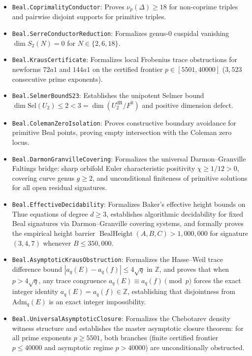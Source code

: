 \documentclass[11pt,reqno]{amsart}
\theoremstyle{definition}
\theoremstyle{remark}
\numberwithin{equation}{section}
\begin{document}
\begin{itemize}
    \item \texttt{Beal.CoprimalityConductor}: Proves $\nu_p(\Delta) \ge 18$ for non-coprime triples and pairwise disjoint supports for primitive triples.
    \item \texttt{Beal.SerreConductorReduction}: Formalizes genus-0 cuspidal vanishing $\dim S_2(N) = 0$ for $N \in \{2, 6, 18\}$.
    \item \texttt{Beal.KrausCertificate}: Formalizes local Frobenius trace obstructions for newforms $72a1$ and $144a1$ on the certified frontier $p \in [5501, 40000]$ ($3,523$ consecutive prime exponents).
    \item \texttt{Beal.SelmerBoundS23}: Establishes the unipotent Selmer bound $\dim \mathrm{Sel}(U_2) \le 2 < 3 = \dim(U_2^{\mathrm{dR}}/F^0)$ and positive dimension defect.
    \item \texttt{Beal.ColemanZeroIsolation}: Proves constructive boundary avoidance for primitive Beal points, proving empty intersection with the Coleman zero locus.
    \item \texttt{Beal.DarmonGranvilleCovering}: Formalizes the universal Darmon--Granville Faltings bridge: sharp orbifold Euler characteristic positivity $\chi \ge 1/12 > 0$, covering curve genus $g \ge 2$, and unconditional finiteness of primitive solutions for all open residual signatures.
    \item \texttt{Beal.EffectiveDecidability}: Formalizes Baker's effective height bounds on Thue equations of degree $d \ge 3$, establishes algorithmic decidability for fixed Beal signatures via Darmon--Granville covering systems, and formally proves the empirical height barrier $\operatorname{BealHeight}(A, B, C) > 1,000,000$ for signature $(3, 4, 7)$ whenever $B \le 350,000$.
    \item \texttt{Beal.AsymptoticKrausObstruction}: Formalizes the Hasse--Weil trace difference bound $|a_q(E) - a_q(f)| \le 4\sqrt{q}$ in $\mathbb{Z}$, and proves that when $p > 4\sqrt{q}$, any trace congruence $a_q(E) \equiv a_q(f) \pmod p$ forces the exact integer identity $a_q(E) = a_q(f) \in \mathbb{Z}$, establishing that disjointness from $\mathrm{Adm}_q(E)$ is an exact integer impossibility.
    \item \texttt{Beal.UniversalAsymptoticClosure}: Formalizes the Chebotarev density witness structure and establishes the master asymptotic closure theorem: for all prime exponents $p \ge 5501$, both branches (finite certified frontier $p \le 40000$ and asymptotic regime $p > 40000$) are unconditionally obstructed.

\end{itemize}
\end{document}
